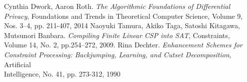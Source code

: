 \documentclass[jou,apacite]{apa6}
\begin{document}
\begin{thebibliography}{1}
 Cynthia Dwork, Aaron Roth.
\textit{The Algorithmic Foundations of Differential Privacy}, Foundations and Trends in Theoretical Computer Science, Volume 9, Nos. 3--4, pp. 211-407, 2014
 Naoyuki Tamura, Akiko Taga, Satoshi Kitagawa, Mutsunori Banbara.
\textit{Compiling Finite Linear CSP into SAT}, Constraints, Volume 14, No. 2, pp.254--272, 2009.
 Rina Dechter.
\textit{Enhancement Schemes for Constraint Processing: Backjumping, Learning, and Cutset Decomposition}, Artificial\\ Intelligence, No. 41, pp. 273-312, 1990
\end{thebibliography}
\end{document}
